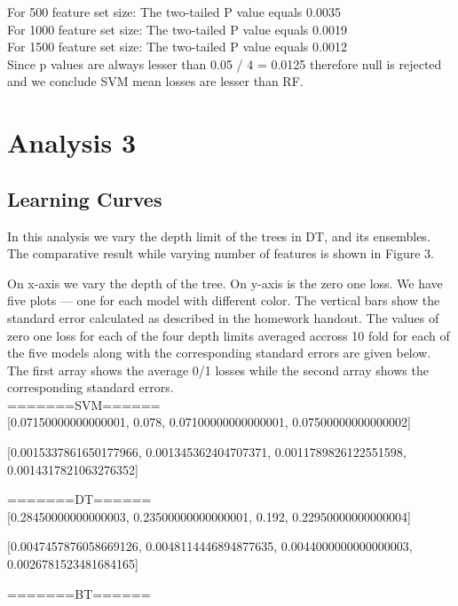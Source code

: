 \documentclass[12pt]{article}
\begin{document}
For 500 feature set size:
  The two-tailed P value equals 0.0035   \\

For 1000 feature set size:
  The two-tailed P value equals 0.0019    \\

For 1500 feature set size:
  The two-tailed P value equals 0.0012   \\

Since p values are always lesser than 0.05 / 4 = 0.0125 therefore null is rejected and we
conclude SVM mean losses are lesser than RF.

\section{Analysis 3}

\subsection{Learning Curves}

In this analysis we vary the depth limit of the trees in DT, and its ensembles. 
The comparative result while varying number of features is shown in Figure 3.

On x-axis we vary the depth of the tree. On y-axis is the zero one loss. 
We have five plots --- one for each model with different color. The vertical 
bars show the standard error calculated as described in the homework handout. The 
values of zero one loss for each of the four depth limits averaged accross 10 fold for 
each of the five models along with the corresponding standard errors are given below. The
first array shows the average 0/1 losses while the second array shows the corresponding 
standard errors.
\\
=======SVM======\\

[0.07150000000000001, 0.078, 0.07100000000000001, 0.07500000000000002]

[0.0015337861650177966, 0.001345362404707371, 0.0011789826122551598, 0.0014317821063276352]

=======DT======\\

[0.28450000000000003, 0.23500000000000001, 0.192, 0.22950000000000004]

[0.0047457876058669126, 0.0048114446894877635, 0.0044000000000000003, 0.0026781523481684165]

=======BT======\\
\end{document}
